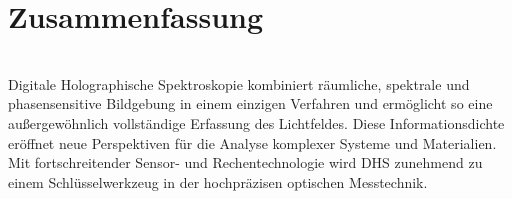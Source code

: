 \documentclass[10pt,twocolumn,a4paper]{article}
\begin{document}
\section{Zusammenfassung}
\vspace{-0.3cm}
\hspace{.0cm}
\vspace{0.3cm}
\\
Digitale Holographische Spektroskopie kombiniert räumliche, spektrale und phasensensitive Bildgebung in einem einzigen Verfahren und ermöglicht so eine außergewöhnlich vollständige Erfassung des Lichtfeldes. Diese Informationsdichte eröffnet neue Perspektiven für die Analyse komplexer Systeme und Materialien. Mit fortschreitender Sensor- und Rechentechnologie wird DHS zunehmend zu einem Schlüsselwerkzeug in der hochpräzisen optischen Messtechnik.

\printbibliography
\end{document}
